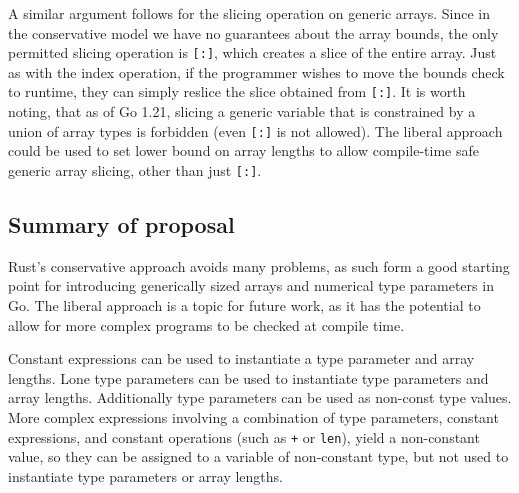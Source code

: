 A similar argument follows for the slicing operation on generic arrays. Since in
the conservative model we have no guarantees about the array bounds, the only
permitted slicing operation is \texttt{[:]}, which creates a slice of the entire
array. Just as with the index operation, if the programmer wishes to move the
bounds check to runtime, they can simply reslice the slice obtained from
\texttt{[:]}. It is worth noting, that as of Go 1.21, slicing a generic variable
that is constrained by a union of array types is forbidden (even \texttt{[:]} is
not allowed). The liberal approach could be used to set lower bound on array
lengths to allow compile-time safe generic array slicing, other than just
\texttt{[:]}.

\subsection{Summary of proposal}

Rust's conservative approach avoids many problems, as such form a good starting
point for introducing generically sized arrays and numerical type parameters in
Go. The liberal approach is a topic for future work, as it has the potential to
allow for more complex programs to be checked at compile time.

Constant expressions can be used to instantiate a  type parameter and
array lengths. Lone  type parameters can be used to instantiate
 type parameters and array lengths. Additionally  type
parameters can be used as non-const  type values. More complex
expressions involving a combination of type parameters, constant expressions,
and constant operations (such as \texttt{+} or \texttt{len}), yield a
non-constant  value, so they can be assigned to a variable of
non-constant  type, but not used to instantiate  type
parameters or array lengths.
